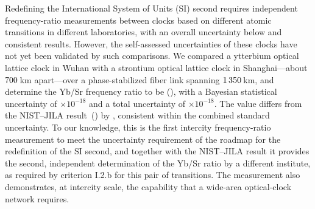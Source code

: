 Redefining the International System of Units (SI) second requires
independent frequency-ratio measurements between clocks based on
different atomic transitions in different laboratories, with an
overall uncertainty below  and consistent results. However, the
self-assessed uncertainties of these clocks have not yet been validated
by such comparisons. We compared a ytterbium optical lattice clock in
Wuhan with a strontium optical lattice clock in Shanghai---about
$700$\,km apart---over a phase-stabilized fiber link spanning
$1\thinspace350$\,km, and determine the Yb/Sr frequency ratio to be
\Rheadline(\RheadlineUnc), with a Bayesian statistical uncertainty of
\uStatShort$\times10^{-18}$ and a total uncertainty of
\uTotalE$\times10^{-18}$. The value differs from the NIST--JILA
result~() by \dVsNistE{}, consistent within the
combined standard uncertainty. To our knowledge, this is the first
intercity frequency-ratio measurement to meet the
uncertainty requirement of the roadmap for the redefinition of the SI
second, and together with the NIST--JILA result it provides the
second, independent determination of the Yb/Sr ratio by a different
institute, as required by criterion I.2.b for this pair of
transitions. The measurement also demonstrates, at intercity scale,
the capability that a wide-area optical-clock network requires.